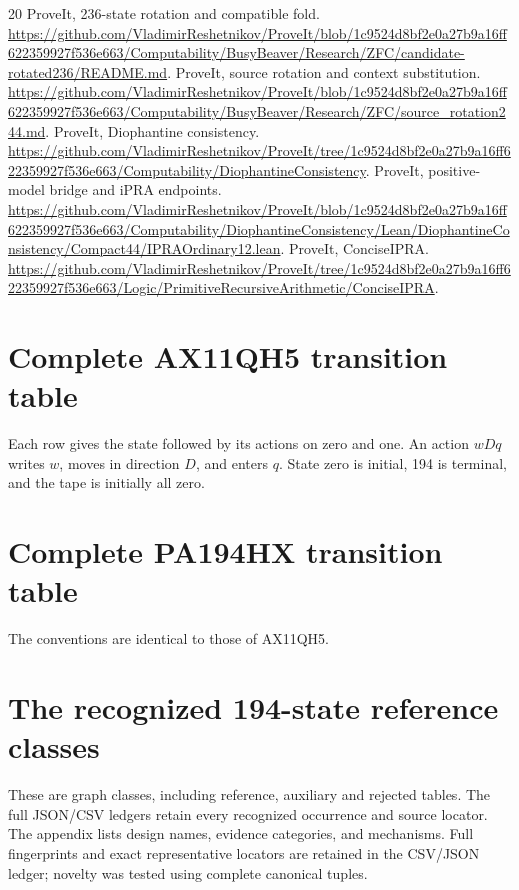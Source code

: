 \documentclass[11pt]{article}
\begin{document}
\begin{thebibliography}{20}
 ProveIt, 236-state rotation and compatible fold.
\url{https://github.com/VladimirReshetnikov/ProveIt/blob/1c9524d8bf2e0a27b9a16ff622359927f536e663/Computability/BusyBeaver/Research/ZFC/candidate-rotated236/README.md}.
 ProveIt, source rotation and context substitution.
\url{https://github.com/VladimirReshetnikov/ProveIt/blob/1c9524d8bf2e0a27b9a16ff622359927f536e663/Computability/BusyBeaver/Research/ZFC/source_rotation244.md}.
 ProveIt, Diophantine consistency.
\url{https://github.com/VladimirReshetnikov/ProveIt/tree/1c9524d8bf2e0a27b9a16ff622359927f536e663/Computability/DiophantineConsistency}.
 ProveIt, positive-model bridge and iPRA endpoints.
\url{https://github.com/VladimirReshetnikov/ProveIt/blob/1c9524d8bf2e0a27b9a16ff622359927f536e663/Computability/DiophantineConsistency/Lean/DiophantineConsistency/Compact44/IPRAOrdinary12.lean}.
 ProveIt, ConciseIPRA.
\url{https://github.com/VladimirReshetnikov/ProveIt/tree/1c9524d8bf2e0a27b9a16ff622359927f536e663/Logic/PrimitiveRecursiveArithmetic/ConciseIPRA}.
\end{thebibliography}

\appendix
\clearpage
\section{Complete AX11QH5 transition table}
Each row gives the state followed by its actions on zero and one. An action
$wDq$ writes $w$, moves in direction $D$, and enters $q$. State zero is
initial, 194 is terminal, and the tape is initially all zero.

\clearpage
\section{Complete PA194HX transition table}
The conventions are identical to those of AX11QH5.

\clearpage

\clearpage
\section{The recognized 194-state reference classes}
These are graph classes, including reference, auxiliary and rejected
tables. The full JSON/CSV ledgers retain every recognized occurrence and
source locator. The appendix lists design names, evidence categories, and mechanisms.
Full fingerprints and exact representative locators are retained in the
CSV/JSON ledger; novelty was tested using complete canonical tuples.

\end{document}
